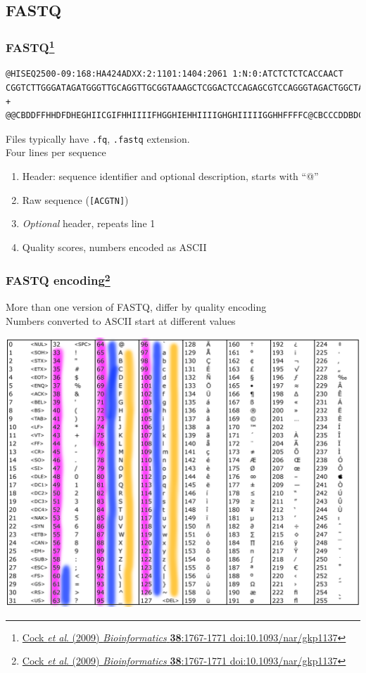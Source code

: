 \subsection{FASTQ}

\begin{frame}[fragile]
  \frametitle{FASTQ\footnote{\tiny{\href{http://dx.doi.org/10.1093/nar/gkp1137}{Cock \textit{et al}. (2009) \textit{Bioinformatics} \textbf{38}:1767-1771 doi:10.1093/nar/gkp1137}}}}
\begin{verbatim}
@HISEQ2500-09:168:HA424ADXX:2:1101:1404:2061 1:N:0:ATCTCTCTCACCAACT
CGGTCTTGGGATAGATGGGTTGCAGGTTGCGGTAAAGCTCGGACTCCAGAGCGTCCAGGGTAGACTGGCTAATCTTCTGCTCTTTATCGATCATTATTTC
+
@@CBDDFFHHDFDHEGHIICGIFHHIIIIFHGGHIEHHIIIIGHGHIIIIIGGHHFFFFC@CBCCCDDBDCDDDDDDDDCCDDDD3@ABDDDDDEEEDE@
\end{verbatim}
  Files typically have \texttt{.fq}, \texttt{.fastq} extension. \\
  Four lines per sequence
  \begin{enumerate}
    \item Header: sequence identifier and optional description, starts with ``@''
    \item Raw sequence (\texttt{[ACGTN]})
    \item \textit{Optional} header, repeats line 1
    \item Quality scores, numbers encoded as ASCII
  \end{enumerate}
\end{frame}

\begin{frame}[fragile]
  \frametitle{FASTQ encoding\footnote{\tiny{\href{http://dx.doi.org/10.1093/nar/gkp1137}{Cock \textit{et al}. (2009) \textit{Bioinformatics} \textbf{38}:1767-1771 doi:10.1093/nar/gkp1137}}}}
  More than one version of FASTQ, differ by quality encoding \\
  Numbers converted to ASCII start at different values
    \begin{center}
      \includegraphics[height=0.7\textheight]{images/ascii_table}
    \end{center}  
\end{frame}

